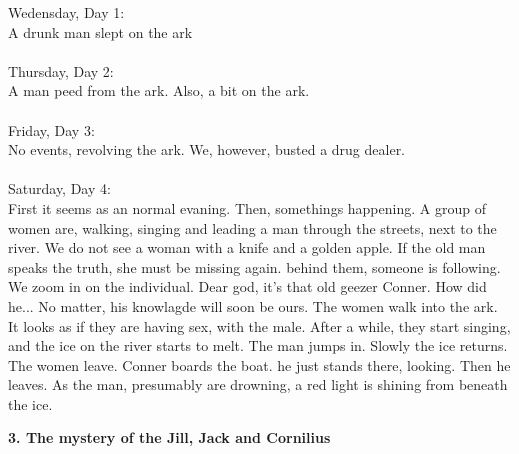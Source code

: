 \documentclass[]{article}
\begin{document}
Wedensday, Day 1: 
\\
A drunk man slept on the ark
\\ \\
Thursday, Day 2: 
\\
A man peed from the ark. Also, a bit on the ark.
\\ \\
Friday, Day  3: 
\\
No events, revolving the ark. We, however, busted a drug dealer.
\\ \\
Saturday, Day 4:
\\
First it seems as an normal evaning. Then, somethings happening. A group of women are, walking, singing and leading a man through the streets, next to the river. We do not see a woman with a knife and a golden apple. If the old man speaks the truth, she must be missing again. behind them, someone is following. We zoom in on the individual. Dear god, it's that old geezer Conner. How did he... No matter, his knowlagde will soon be ours. The women walk into the ark. It looks as if they are having sex, with the male. After a while, they start singing, and the ice on the river starts to melt. The man jumps in. Slowly the ice returns. The women leave. Conner boards the boat. he just stands there, looking. Then he leaves. As the man, presumably are drowning, a red light is shining from beneath the ice. 

\begin{center}
	\large\textbf{3. The mystery of the Jill, Jack and Cornilius}
\end{center}
\end{document}
